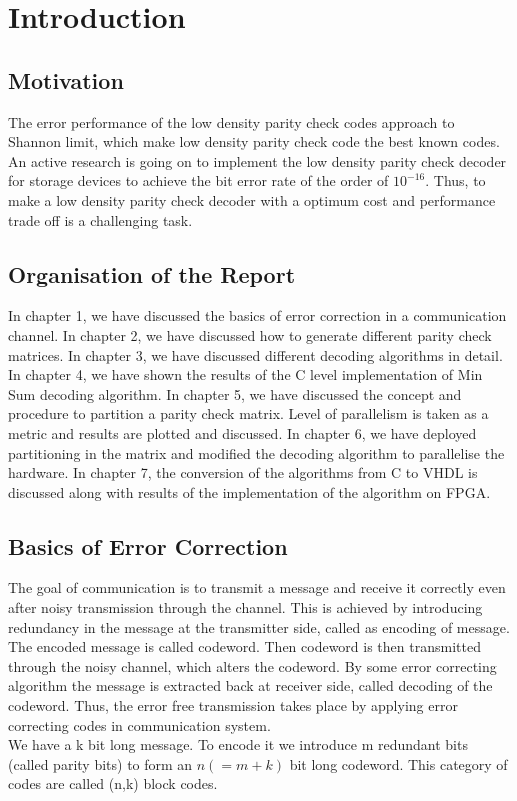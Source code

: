 
\chapter{Introduction} 
\label{Chapter1} 


\section{Motivation }
The error performance of the low density parity check  codes approach to Shannon limit, which make low density parity check code the best known codes. An active research is going on to implement the low density parity check decoder for storage devices to achieve the bit error rate of the order of $10^{-16}$. Thus, to make a low density parity check  decoder with a optimum cost and performance trade off is a challenging task.

\section{Organisation of the Report }

In chapter 1, we have discussed the basics of error correction in a communication channel. In chapter 2, we have discussed how to generate different parity check matrices. In chapter 3, we have discussed different decoding algorithms in detail. In chapter 4, we have shown the results of the C level implementation of Min Sum decoding algorithm. In chapter 5, we have discussed the concept and procedure to partition a parity check matrix. Level of parallelism is taken as a metric and results are plotted and discussed. In chapter 6, we have deployed partitioning in the matrix and modified the decoding algorithm to parallelise the hardware. In chapter 7, the conversion of the algorithms from C to VHDL is discussed along with results of the implementation of the algorithm on FPGA.
\section{Basics of Error Correction }
  
The goal of communication is to transmit a message and receive it correctly even after noisy transmission through the channel. This is achieved by introducing redundancy in the message at the transmitter side, called as encoding of message. The encoded message is called codeword. Then codeword is then transmitted through the noisy channel, which alters the codeword. By some error correcting algorithm the message is extracted back at receiver side, called decoding of the codeword. Thus, the error free transmission takes place by applying error correcting codes in communication system.\\
We have a k bit long message. To encode it we introduce m redundant bits (called parity bits) to form an $n(=m+k)$ bit long codeword. This category of codes are called (n,k) block codes. 

